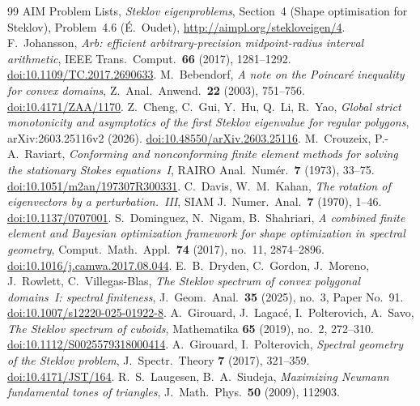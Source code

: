 \documentclass[11pt]{article}
\theoremstyle{definition}
\theoremstyle{remark}
\begin{document}
\raggedright
\begin{thebibliography}{99}
 AIM Problem Lists, \emph{Steklov eigenproblems}, Section~4 (Shape optimisation for Steklov), Problem~4.6 (\'E.~Oudet), \url{http://aimpl.org/stekloveigen/4}.
 F.~Johansson, \emph{Arb: efficient arbitrary-precision midpoint-radius interval arithmetic}, IEEE Trans.\ Comput.\ \textbf{66} (2017), 1281--1292.
\href{https://doi.org/10.1109/TC.2017.2690633}{doi:10.1109/TC.2017.2690633}.
 M.~Bebendorf, \emph{A note on the Poincar\'e inequality for convex domains}, Z.~Anal.\ Anwend.\ \textbf{22} (2003), 751--756.
\href{https://doi.org/10.4171/ZAA/1170}{doi:10.4171/ZAA/1170}.
 Z.~Cheng, C.~Gui, Y.~Hu, Q.~Li, R.~Yao, \emph{Global strict monotonicity and asymptotics of the first Steklov eigenvalue for regular polygons}, arXiv:2603.25116v2 (2026).
\href{https://doi.org/10.48550/arXiv.2603.25116}{doi:10.48550/arXiv.2603.25116}.
 M.~Crouzeix, P.-A.~Raviart, \emph{Conforming and nonconforming finite element methods for solving the stationary Stokes equations~I}, RAIRO Anal.\ Num\'er.\ \textbf{7} (1973), 33--75.
\href{https://doi.org/10.1051/m2an/197307R300331}{doi:10.1051/m2an/197307R300331}.
 C.~Davis, W.~M.~Kahan, \emph{The rotation of eigenvectors by a perturbation.~III}, SIAM J.\ Numer.\ Anal.\ \textbf{7} (1970), 1--46.
\href{https://doi.org/10.1137/0707001}{doi:10.1137/0707001}.
 S.~Dominguez, N.~Nigam, B.~Shahriari, \emph{A combined finite element and Bayesian optimization framework for shape optimization in spectral geometry}, Comput.\ Math.\ Appl.\ \textbf{74} (2017), no.~11, 2874--2896.
\href{https://doi.org/10.1016/j.camwa.2017.08.044}{doi:10.1016/j.camwa.2017.08.044}.
 E.~B.~Dryden, C.~Gordon, J.~Moreno, J.~Rowlett, C.~Villegas-Blas, \emph{The Steklov spectrum of convex polygonal domains~I: spectral finiteness}, J.\ Geom.\ Anal.\ \textbf{35} (2025), no.~3, Paper No.~91.
\href{https://doi.org/10.1007/s12220-025-01922-8}{doi:10.1007/s12220-025-01922-8}.
 A.~Girouard, J.~Lagac\'e, I.~Polterovich, A.~Savo, \emph{The Steklov spectrum of cuboids}, Mathematika \textbf{65} (2019), no.~2, 272--310.
\href{https://doi.org/10.1112/S0025579318000414}{doi:10.1112/S0025579318000414}.
 A.~Girouard, I.~Polterovich, \emph{Spectral geometry of the Steklov problem}, J.\ Spectr.\ Theory \textbf{7} (2017), 321--359.
\href{https://doi.org/10.4171/JST/164}{doi:10.4171/JST/164}.
 R.~S.~Laugesen, B.~A.~Siudeja, \emph{Maximizing Neumann fundamental tones of triangles}, J.\ Math.\ Phys.\ \textbf{50} (2009), 112903.

\end{thebibliography}
\end{document}
